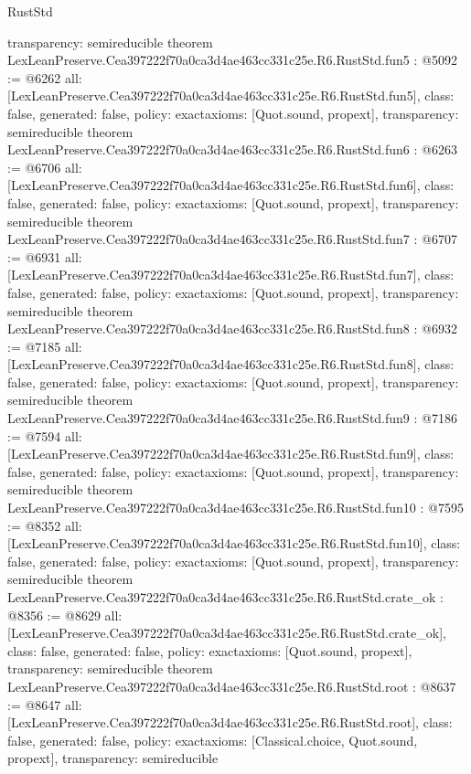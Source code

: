 \begin{lexlean}{RustStd}
\begin{coremodule}
{  transparency: semireducible
}
theorem LexLeanPreserve.Cea397222f70a0ca3d4ae463cc331c25e.R6.RustStd.fun5 : @5092 := @6262 {
  all: [LexLeanPreserve.Cea397222f70a0ca3d4ae463cc331c25e.R6.RustStd.fun5],
  class: false,
  generated: false,
  policy: exact{axioms: [Quot.sound, propext]},
  transparency: semireducible
}
theorem LexLeanPreserve.Cea397222f70a0ca3d4ae463cc331c25e.R6.RustStd.fun6 : @6263 := @6706 {
  all: [LexLeanPreserve.Cea397222f70a0ca3d4ae463cc331c25e.R6.RustStd.fun6],
  class: false,
  generated: false,
  policy: exact{axioms: [Quot.sound, propext]},
  transparency: semireducible
}
theorem LexLeanPreserve.Cea397222f70a0ca3d4ae463cc331c25e.R6.RustStd.fun7 : @6707 := @6931 {
  all: [LexLeanPreserve.Cea397222f70a0ca3d4ae463cc331c25e.R6.RustStd.fun7],
  class: false,
  generated: false,
  policy: exact{axioms: [Quot.sound, propext]},
  transparency: semireducible
}
theorem LexLeanPreserve.Cea397222f70a0ca3d4ae463cc331c25e.R6.RustStd.fun8 : @6932 := @7185 {
  all: [LexLeanPreserve.Cea397222f70a0ca3d4ae463cc331c25e.R6.RustStd.fun8],
  class: false,
  generated: false,
  policy: exact{axioms: [Quot.sound, propext]},
  transparency: semireducible
}
theorem LexLeanPreserve.Cea397222f70a0ca3d4ae463cc331c25e.R6.RustStd.fun9 : @7186 := @7594 {
  all: [LexLeanPreserve.Cea397222f70a0ca3d4ae463cc331c25e.R6.RustStd.fun9],
  class: false,
  generated: false,
  policy: exact{axioms: [Quot.sound, propext]},
  transparency: semireducible
}
theorem LexLeanPreserve.Cea397222f70a0ca3d4ae463cc331c25e.R6.RustStd.fun10 : @7595 := @8352 {
  all: [LexLeanPreserve.Cea397222f70a0ca3d4ae463cc331c25e.R6.RustStd.fun10],
  class: false,
  generated: false,
  policy: exact{axioms: [Quot.sound, propext]},
  transparency: semireducible
}
theorem LexLeanPreserve.Cea397222f70a0ca3d4ae463cc331c25e.R6.RustStd.crate_ok : @8356 := @8629 {
  all: [LexLeanPreserve.Cea397222f70a0ca3d4ae463cc331c25e.R6.RustStd.crate_ok],
  class: false,
  generated: false,
  policy: exact{axioms: [Quot.sound, propext]},
  transparency: semireducible
}
theorem LexLeanPreserve.Cea397222f70a0ca3d4ae463cc331c25e.R6.RustStd.root : @8637 := @8647 {
  all: [LexLeanPreserve.Cea397222f70a0ca3d4ae463cc331c25e.R6.RustStd.root],
  class: false,
  generated: false,
  policy: exact{axioms: [Classical.choice, Quot.sound, propext]},
  transparency: semireducible
}


\end{coremodule}
\end{lexlean}

